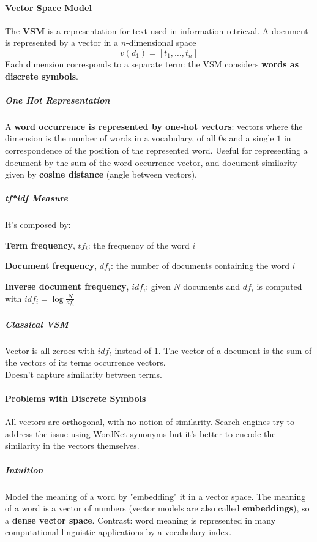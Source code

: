 \documentclass[10pt]{report}
\begin{document}
\paragraph{Vector Space Model} The \textbf{VSM} is a representation for text used in information retrieval. A document is represented by a vector in a $n$-dimensional space $$v(d_1) = [t_1,\ldots, t_n]$$
Each dimension corresponds to a separate term: the VSM considers \textbf{words as discrete symbols}.
\subparagraph{One Hot Representation} A \textbf{word occurrence is represented by one-hot vectors}: vectors where the dimension is the number of words in a vocabulary, of all $0$s and a single $1$ in correspondence of the position of the represented word. Useful for representing a document by the sum of the word occurrence vector, and document similarity given by \textbf{cosine distance} (angle between vectors).
\subparagraph{tf*idf Measure} It's composed by:
\begin{list}{}{}
	\item \textbf{Term frequency}, $tf_i$: the frequency of the word $i$
	\item \textbf{Document frequency}, $df_i$: the number of documents containing the word $i$
	\item \textbf{Inverse document frequency}, $idf_i$: given $N$ documents and $df_i$ is computed with $idf_i=\log\frac{N}{df_i}$
\end{list}
\subparagraph{Classical VSM} Vector is all zeroes with $idf_t$ instead of $1$. The vector of a document is the sum of the vectors of its terms occurrence vectors.\\
Doesn't capture similarity between terms.
\paragraph{Problems with Discrete Symbols} All vectors are orthogonal, with no notion of similarity. Search engines try to address the issue using WordNet synonyms but it's better to encode the similarity in the vectors themselves.
\subparagraph{Intuition} Model the meaning of a word by "embedding" it in a vector space. The meaning of a word is a vector of numbers (vector models are also called \textbf{embeddings}), so a \textbf{dense vector space}. Contrast: word meaning is represented in many computational linguistic applications by a vocabulary index.
\end{document}
